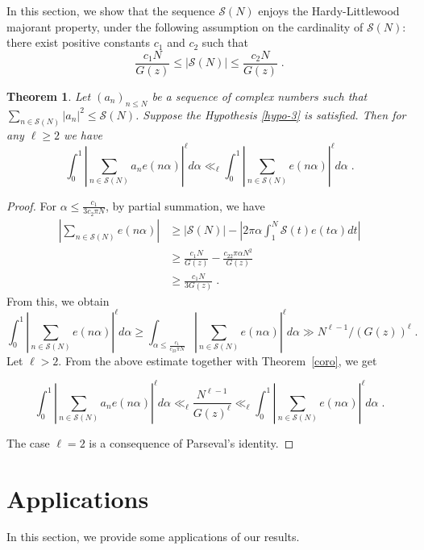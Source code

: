 \documentclass[12pt,article]{amsart}
\newtheorem{theorem}{Theorem}[section]
\theoremstyle{remark}
\numberwithin{equation}{section}
\begin{document}
	
	\vspace{2mm}
	In this section, we show that the sequence $\mathcal{S}(N)$ enjoys the Hardy-Littlewood majorant property, under the following  assumption on the cardinality of $\mathcal{S}(N)$: there exist positive constants $c_1$ and $c_2$ such that
	\begin{equation} 
		\tag{H3}\label{hypo-3}
		\frac{c_1N}{G(z)}\leq |\mathcal{S}(N)|\leq \frac{c_2N}{G(z)}\; .
	\end{equation}
	
	\begin{theorem}
		Let $(a_n)_{n\leq N}$ be a sequence of complex numbers such that $\sum_{n\in\mathcal{S}(N)}|a_n|^2\leq \mathcal{S}(N)$. Suppose the Hypothesis \eqref{hypo-3} is satisfied.  Then for any $\ell\geq2$ we have
		\[\int_0^1\left|\sum_{n\in\mathcal{S}(N)}a_ne(n\alpha)\right|^\ell d\alpha\ll_\ell\int_0^1\left|\sum_{n\in\mathcal{S}(N)}e(n\alpha)\right|^\ell d\alpha\;.\]
	\end{theorem}
	\begin{proof}
		For $\alpha\leq \frac{c_1}{3c_2\pi N}$, by partial summation, we have 
		\begin{align*}
			\left|\sum_{n\in \mathcal{S}(N)}e(n\alpha)\right|&\geq |\mathcal{S}(N)|-\left|2\pi \alpha\int_{1}^N\mathcal{S}(t)e(t\alpha)dt\right|\\
			&\geq \frac{c_1N}{G(z)}-\frac{c_22\pi \alpha N^2}{G(z)}  \\
			&\geq \frac{c_1N}{3G(z)}\; .
		\end{align*}
		From this, we obtain
		\[\int_0^1\left|\sum_{n\in\mathcal{S}(N)}e(n\alpha)\right|^\ell d\alpha\geq\int_{\alpha\leq\frac{c_1}{c_23\pi N}}\left|\sum_{n\in\mathcal{S}(N)}e(n\alpha)\right|^\ell d\alpha\gg N^{\ell-1}/(G(z))^\ell\;.\] 
		Let $\ell>2.$ From  the above estimate together with Theorem~\ref{coro}, we get
		
		\[\int_0^1\left|\sum_{n\in\mathcal{S}(N)}a_ne(n\alpha)\right|^\ell d\alpha\ll_\ell \frac{N^{\ell-1}}{G(z)^\ell}\ll_{\ell}\int_0^1\left|\sum_{n\in\mathcal{S}(N)}e(n\alpha)\right|^\ell d\alpha\; .\]
		
		
		\noindent   The case $\ell=2$ is a consequence of Parseval's identity.
	\end{proof}
	
	\section{Applications}\label{appl}
	In this section, we provide some applications of our results.
	
\end{document}
